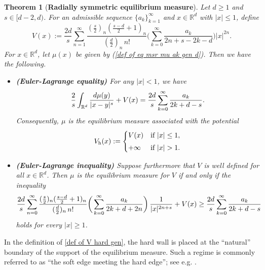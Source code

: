 \documentclass[10pt]{amsart}
\def\R{\mathbb{R}}
\theoremstyle{plain}
\newtheorem{thm}{Theorem}[section]
\theoremstyle{remark}
\numberwithin{equation}{section}
\begin{document}
\begin{thm}[\textbf{Radially symmetric equilibrium measure}] \label{Thm_radial}
Let $d \ge 1$ and $s \in [d-2,d)$. 
For an admissible sequence $\{a_k\}_{k=1}^\infty$ and $x \in \R^d$ with $|x| \le 1$, define 
\begin{equation} \label{def of V gen d}
V(x) :=   \frac{ 2d   }{ s   }   \sum_{n=1}^\infty \frac{ (\frac{s}{2})_n  ( \frac{s-d}{2}+1 )_n  }{ (\frac{d}{2})_n \, n! } \bigg( \sum_{k=0}^\infty \frac{ a_k}{ 2n+s-2k-d } \bigg) |x|^{2n} . 
\end{equation}  
For $x \in \R^d$, let $\mu(x)$ be given by (\ref{def of eq msr mu ak gen d}).
Then we have the following. 
\begin{itemize}
    \item[\textup{(i)}] \textbf{\textup{(Euler-Lagrange equality)}} For any $|x|<1$, we have 
    \begin{equation} \label{EL eqn for hard wall}
\frac{2}{s} \int_{ \R^d } \frac{ d\mu(y) }{ |x-y|^s } +V(x) =  {2 d \over s} \sum_{k=0}^\infty {a_k \over 2k + d - s}. 
\end{equation} 
    Consequently, $\mu$ is the equilibrium measure associated with the potential 
    \begin{equation} \label{def of V hard gen}
V_{ \rm h }(x) := \begin{cases}
V(x) &\textup{if } |x| \le 1,
\smallskip
\\
+\infty &\textup{if } |x| >1. 
\end{cases}
\end{equation} 
    \item[\textup{(ii)}] \textbf{\textup{(Euler-Lagrange inequality)}} Suppose furthermore that $V$ is well defined for all $x \in \mathbb{R}^d$. 
Then $\mu$ is the equilibrium measure for $V$ if and only if the inequality 
\begin{align} \label{inequality for general}
  \frac{ 2d   }{ s   }  \sum_{n=0}^\infty \frac{ (\frac{s}{2})_n  ( \frac{s-d}{2}+1 )_n  }{  (\frac{d}{2})_n \, n! }   \bigg( \sum_{k=0}^\infty \frac{a_k}{2k+d+2n} \bigg) \, \frac{1}{|x|^{2n+s}}
+V(x) \ge {2 d \over s} \sum_{k=0}^\infty {a_k \over 2k + d - s}  
\end{align} 
holds for every $|x|\ge1$.  
\end{itemize}
\end{thm}
 
In the definition of \eqref{def of V hard gen}, the hard wall is placed at the ``natural'' boundary of the support of the equilibrium measure.
    Such a regime is commonly referred to as ``the soft edge meeting the hard edge''; see e.g. \cite{CK08,AKM19,AKMW20,CW25,CFLV17,CFLV19}. 
\end{document}
